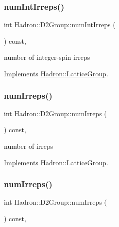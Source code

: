 \subsubsection{\texorpdfstring{numIntIrreps()}{numIntIrreps()}\hspace{0.1cm}{\footnotesize\ttfamily [2/2]}}
{\footnotesize\ttfamily int Hadron\+::\+D2\+Group\+::num\+Int\+Irreps (\begin{DoxyParamCaption}{ }\end{DoxyParamCaption}) const\hspace{0.3cm}{\ttfamily [inline]}, {\ttfamily [virtual]}}

number of integer-\/spin irreps 

Implements \mbox{\hyperlink{structHadron_1_1LatticeGroup_af2aa7b39222bf188389356eefcef7547}{Hadron\+::\+Lattice\+Group}}.

\mbox{\label{structHadron_1_1D2Group_a24644ff5f0fc06adeb26457c9ce772a5}} 
\subsubsection{\texorpdfstring{numIrreps()}{numIrreps()}\hspace{0.1cm}{\footnotesize\ttfamily [1/2]}}
{\footnotesize\ttfamily int Hadron\+::\+D2\+Group\+::num\+Irreps (\begin{DoxyParamCaption}{ }\end{DoxyParamCaption}) const\hspace{0.3cm}{\ttfamily [inline]}, {\ttfamily [virtual]}}

number of irreps 

Implements \mbox{\hyperlink{structHadron_1_1LatticeGroup_a3edaca488144b5d2a9cf73fe653add34}{Hadron\+::\+Lattice\+Group}}.

\mbox{\label{structHadron_1_1D2Group_a24644ff5f0fc06adeb26457c9ce772a5}} 
\subsubsection{\texorpdfstring{numIrreps()}{numIrreps()}\hspace{0.1cm}{\footnotesize\ttfamily [2/2]}}
{\footnotesize\ttfamily int Hadron\+::\+D2\+Group\+::num\+Irreps (\begin{DoxyParamCaption}{ }\end{DoxyParamCaption}) const\hspace{0.3cm}{\ttfamily [inline]}, {\ttfamily [virtual]}}

